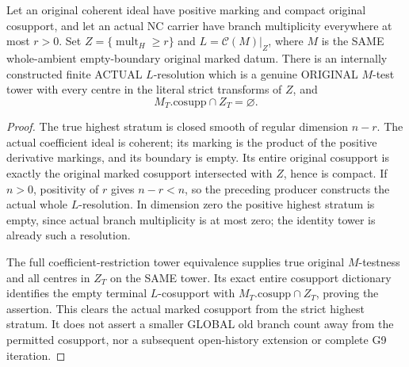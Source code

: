 \begin{theorem}
\label{hir:nc-original-whole-coefficient-stratum-resolution}
\leanok
Let an original coherent ideal have positive marking and compact original
cosupport, and let an actual NC carrier have branch multiplicity everywhere
at most $r>0$. Set $Z=\{\operatorname{mult}_H\ge r\}$ and
$L=\mathcal C(M)|_Z$, where $M$ is the SAME whole-ambient empty-boundary original
marked datum. There is an internally constructed finite ACTUAL $L$-resolution
which is a genuine ORIGINAL $M$-test tower with every centre in the literal
strict transforms of $Z$, and
\[
 M_T.\mathrm{cosupp}\cap Z_T=\varnothing.
\]
\end{theorem}
\begin{proof}
The true highest stratum is closed smooth of regular dimension $n-r$.
The actual coefficient ideal is coherent; its marking is the product of
the positive derivative markings, and its boundary is empty. Its entire
original cosupport is exactly the original marked cosupport intersected with
$Z$, hence is compact. If $n>0$, positivity of $r$ gives $n-r<n$, so the
preceding producer constructs the actual whole $L$-resolution. In dimension
zero the positive highest stratum is empty, since actual branch multiplicity
is at most zero; the identity tower is already such a resolution.

The full coefficient-restriction tower equivalence supplies true original
$M$-testness and all centres in $Z_T$ on the SAME tower. Its exact entire
cosupport dictionary identifies the empty terminal $L$-cosupport with
$M_T.\mathrm{cosupp}\cap Z_T$, proving the assertion. This clears the actual
marked cosupport from the strict highest stratum. It does not assert a smaller
GLOBAL old branch count away from the permitted cosupport, nor a subsequent
open-history extension or complete G9 iteration.
\end{proof}
